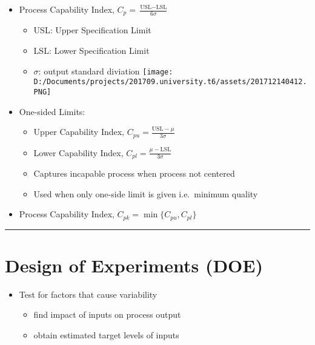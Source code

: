 \documentclass[11pt]{article}
\makeatletter
\def\maxwidth{\ifdim\Gin@nat@width>\linewidth\linewidth
    \else\Gin@nat@width\fi}
\let\Oldincludegraphics\includegraphics
\renewcommand{\includegraphics}[1]{\Oldincludegraphics[width=.8\maxwidth]{#1}}
\providecommand{\tightlist}{%
      \setlength{\itemsep}{0pt}\setlength{\parskip}{0pt}}
\makeatother
\begin{document}
\begin{itemize}
\tightlist
\item
  Process Capability Index,
  \(C_p = \frac{\text{USL} - \text{LSL}}{6\sigma}\)

  \begin{itemize}
  \tightlist
  \item
    USL: Upper Specification Limit
  \item
    LSL: Lower Specification Limit
  \item
    \(\sigma\): output standard diviation
    \texttt{[image: D:/Documents/projects/201709.university.t6/assets/201712140412.PNG]}
  \end{itemize}
\item
  One-sided Limits:

  \begin{itemize}
  \tightlist
  \item
    Upper Capability Index, \(C_{pu}=\frac{\text{USL}-\mu}{3\sigma}\)
  \item
    Lower Capability Index, \(C_{pl}=\frac{\mu-\text{LSL}}{3\sigma}\)
  \item
    Captures incapable process when process not centered
  \item
    Used when only one-side limit is given i.e.~minimum quality
  \end{itemize}
\item
  Process Capability Index, \(C_{pk}=\min\{C_{pu},C_{pl}\}\)
\end{itemize}

\begin{center}\rule{0.5\linewidth}{\linethickness}\end{center}

    \hypertarget{design-of-experiments-doe}{%
\section{Design of Experiments (DOE)}\label{design-of-experiments-doe}}

\begin{itemize}
\tightlist
\item
  Test for factors that cause variability

  \begin{itemize}
  \tightlist
  \item
    find impact of inputs on process output
  \item
    obtain estimated target levels of inputs
  \end{itemize}
\end{itemize}
\end{document}
